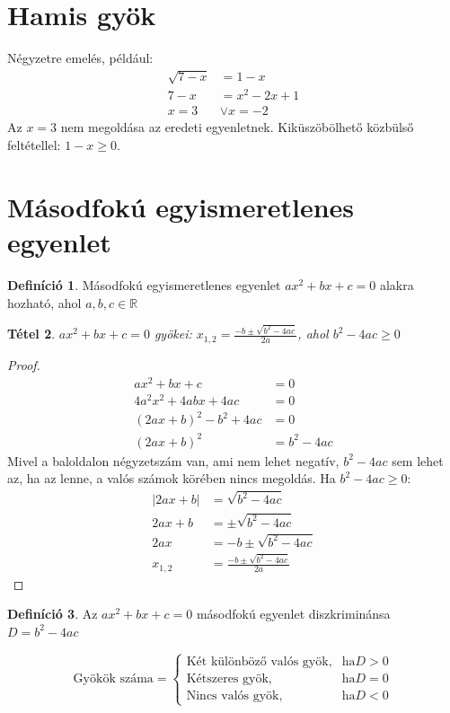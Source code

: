 \documentclass[twoside,12pt]{report}
\newtheorem{theorem}{Tétel}[section]
\theoremstyle{definition}
\newtheorem{definition}[theorem]{Definíció}
\begin{document}
\section{Hamis gyök}
	Négyzetre emelés, például:
	\begin{align*}
		\sqrt{7-x}&=1-x\tag{Négyzetre emelés}\\
		7-x&=x^2-2x+1\\
		x=3&\vee x=-2
	\end{align*}
	Az $x=3$ nem megoldása az eredeti egyenletnek. Kiküszöbölhető közbülső feltétellel: $1-x\ge0$.
\section{Másodfokú egyismeretlenes egyenlet}
	\begin{definition}
		Másodfokú egyismeretlenes egyenlet $ax^2+bx+c=0$ alakra hozható, ahol $a,b,c\in\mathbb{R}$
	\end{definition}
	\begin{theorem}
		$ax^2+bx+c=0$ gyökei: $x_{1,2}=\frac{-b\pm\sqrt{b^2-4ac}}{2a}$, ahol $b^2-4ac\ge0$
	\end{theorem}
	\begin{proof}
		\begin{align*}
			ax^2+bx+c&=0\tag{$*4a$}\\
			4a^2x^2+4abx+4ac&=0\tag{Teljes négyzetté alakítás}\\
			(2ax+b)^2-b^2+4ac&=0\tag{$+b^2-4ac$}\\
			(2ax+b)^2&=b^2-4ac
		\end{align*}
		Mivel a baloldalon négyzetszám van, ami nem lehet negatív, $b^2-4ac$ sem lehet az, ha az lenne, a valós számok körében nincs megoldás. Ha $b^2-4ac\ge0$:
		\begin{align*}
			|2ax+b|&=\sqrt{b^2-4ac}\\
			2ax+b&=\pm\sqrt{b^2-4ac}\\
			2ax&=-b\pm\sqrt{b^2-4ac}\\
			x_{1,2}&=\frac{-b\pm\sqrt{b^2-4ac}}{2a}
		\end{align*}
	\end{proof}
	\begin{definition}
		Az $ax^2+bx+c=0$ másodfokú egyenlet diszkriminánsa $D=b^2-4ac$
	\end{definition}
	\begin{equation*}
	\text{Gyökök száma}=
	\begin{cases*}
		\text{Két különböző valós gyök}, & \text{ha} D>0\\
		\text{Kétszeres gyök}, &\text{ha} D=0\\
		\text{Nincs valós gyök},&\text{ha} D<0
	\end{cases*}
	\end{equation*}
\end{document}
